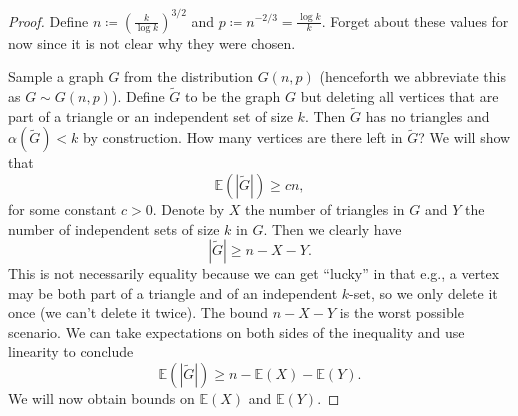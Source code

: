 \documentclass{report}
\theoremstyle{definition}
\theoremstyle{plain}
\theoremstyle{definition}
\begin{document}
	\begin{proof}
		Define $n\coloneqq \left(\frac{k}{\log k}\right)^{3/2}$ and $p \coloneqq n^{-2/3} = \frac{\log k}{k}$. Forget about these values for now since it is not clear why they were chosen. 
		
		Sample a graph $G$ from the distribution $G(n,p)$ (henceforth we abbreviate this as $G\sim G(n,p)$). Define $\tilde{G}$ to be the graph $G$ but deleting all vertices that are part of a triangle or an independent set of size $k$. Then $\tilde{G}$ has no triangles and $\alpha(\tilde{G}) <k$ by construction. How many vertices are there left in $\tilde{G}$? We will show that
		\[
			\mathbb{E}(|\tilde{G}|) \geq cn,
		\]
		for some constant $c>0$. Denote by $X$ the number of triangles in $G$ and $Y$ the number of independent sets of size $k$ in $G$. Then we clearly have
		\[
			|\tilde{G}| \geq n - X - Y.
		\]
		This is not necessarily equality because we can get ``lucky'' in that e.g., a vertex may be both part of a triangle and of an independent $k$-set, so we only delete it once (we can't delete it twice). The bound $n - X -Y$ is the worst possible scenario. We can take expectations on both sides of the inequality and use linearity to conclude
		\begin{equation}
			\mathbb{E}(|\tilde{G}|) \geq n - \mathbb{E}(X) - \mathbb{E}(Y).
		\end{equation}
		We will now obtain bounds on $\mathbb{E}(X)$ and $\mathbb{E}(Y)$.
		

\end{proof}
\end{document}

